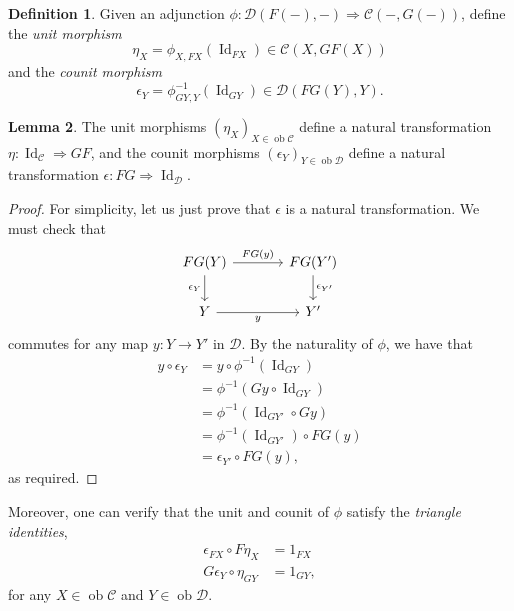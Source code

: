 \documentclass[10pt,letterpaper,cm]{nupset}
\theoremstyle{definition}
\newtheorem{definition}{Definition}[section]
\theoremstyle{theorem}
\newtheorem{lemma}[definition]{Lemma}
\theoremstyle{remark}
\newcommand{\1}{\mathbf{1}}
\renewcommand{\c}{\mathscr{C}}
\renewcommand{\d}{\mathscr{D}}
\newcommand{\0}{\vec 0}
\DeclareMathOperator{\id}{Id}
\DeclareMathOperator{\ob}{ob}
\begin{document}
\begin{definition}
Given an adjunction $\phi: \d(F(-), -) \Rightarrow \c(-, G(-))$, define the \textit{unit morphism } $$\eta_X =\phi_{X, F{X}}\left(\id_{F{X}}\right) \in \c(X, GF(X))$$ and the \textit{counit morphism} $$\epsilon_Y =\phi_{G{Y}, Y}^{{-1}}\left(\id_{G{Y}}\right) \in \d(FG(Y), Y).$$
\end{definition}

\begin{lemma}
The unit morphisms $\left(\eta_X\right)_{X\in \ob{\c}}$ define a natural transformation $\eta: \id_{\c} \Rightarrow GF$, and the counit morphisms $\left(\epsilon_Y\right)_{Y\in \ob{\d}}$ define a natural transformation $\epsilon: FG \Rightarrow \id_{\d}$.
\end{lemma}
\begin{proof}
For simplicity, let us just prove that $\epsilon$ is a natural transformation. We must check that
\[
\begin{tikzcd}[column sep=large]
FG(Y) \arrow[d, "\epsilon_Y"'] \arrow[r, "FG(y)"] & FG(Y') \arrow[d, "\epsilon_{Y'}"] \\
Y \arrow[r, "y"']                             & Y'                               
\end{tikzcd}
\] commutes for any map $y: Y\to Y'$ in $\d$. By the naturality of $\phi$, we have that
\begin{align*}
y\circ \epsilon_Y  & =  y\circ \phi^{{-1}}\left(\id_{G{Y}}\right)
\\ & = \phi^{{-1}}\left(G{y} \circ \id_{G{Y}}\right)
\\ & =  \phi^{{-1}}\left(\id_{G{Y'}} \circ G{y}\right)
\\ & =   \phi^{{-1}}\left( \id_{G{Y'}}\right) \circ FG(y) 
\\ & = \epsilon_{Y'} \circ FG(y)
,\end{align*} as required.
\end{proof}

Moreover, one can verify that the unit and counit of $\phi$ satisfy the \textit{triangle identities},
\begin{align}
\epsilon_{F{X}} \circ F \eta_{X} &=1_{F{X}} \label{tri1} \tag{$\vartriangle_1$}
\\ G \epsilon_{Y} \circ \eta_{G{Y}} &=1_{G{Y}}, \label{tri2} \tag{$\vartriangle_2$}
\end{align}
for any $X\in \ob{\c}$ and $Y\in \ob{\d}$.

\smallskip
\end{document}
